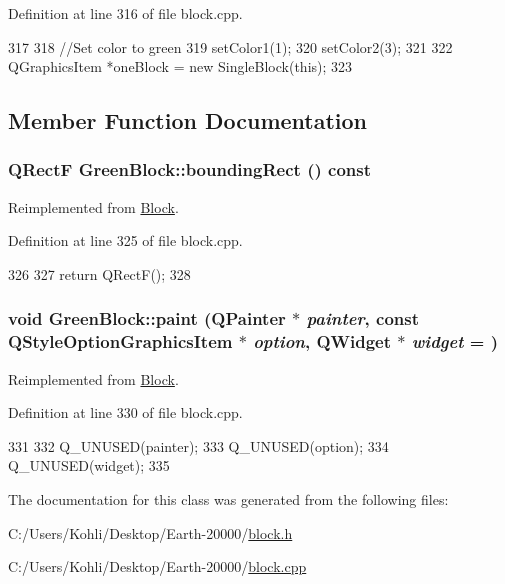 Definition at line 316 of file block.cpp.


\begin{DoxyCode}
317 {
318     //Set color to green
319     setColor1(1);
320     setColor2(3);
321 
322     QGraphicsItem *oneBlock = new SingleBlock(this);
323 }
\end{DoxyCode}


\subsection{Member Function Documentation}
\hypertarget{class_green_block_a302d2bfd76e7f40196c699ae52607175}{
\subsubsection[{boundingRect}]{\setlength{\rightskip}{0pt plus 5cm}QRectF GreenBlock::boundingRect () const}}
\label{class_green_block_a302d2bfd76e7f40196c699ae52607175}


Reimplemented from \hyperlink{class_block_aee4444b92a82f5a8080e9019ef1e554d}{Block}.

Definition at line 325 of file block.cpp.


\begin{DoxyCode}
326 {
327     return QRectF();
328 }
\end{DoxyCode}
\hypertarget{class_green_block_a8ca48ce5449a83de5287d13d99bf2df1}{
\subsubsection[{paint}]{\setlength{\rightskip}{0pt plus 5cm}void GreenBlock::paint (QPainter $\ast$ {\em painter}, \/  const QStyleOptionGraphicsItem $\ast$ {\em option}, \/  QWidget $\ast$ {\em widget} = {})}}
\label{class_green_block_a8ca48ce5449a83de5287d13d99bf2df1}


Reimplemented from \hyperlink{class_block_a36791d086b6fad1a2203bfef6fdbaa0a}{Block}.

Definition at line 330 of file block.cpp.


\begin{DoxyCode}
331 {
332     Q_UNUSED(painter);
333     Q_UNUSED(option);
334     Q_UNUSED(widget);
335 }
\end{DoxyCode}


The documentation for this class was generated from the following files:\begin{DoxyCompactItemize}
\item 
C:/Users/Kohli/Desktop/Earth-\/20000/\hyperlink{block_8h}{block.h}\item 
C:/Users/Kohli/Desktop/Earth-\/20000/\hyperlink{block_8cpp}{block.cpp}\end{DoxyCompactItemize}

